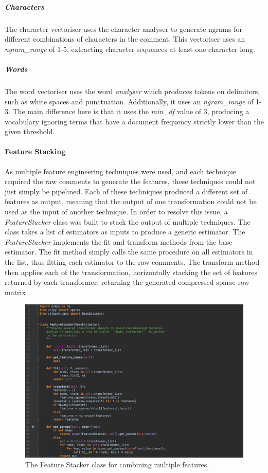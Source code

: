 \subparagraph{Characters} The character vectoriser uses the character analyser to generate ngrams for different combinations of characters in the comment. This vectoriser uses an \textit{ngram\_range} of 1-5, extracting character sequences at least one character long.

\subparagraph{Words} The word vectoriser uses the word \textit{analyser} which produces tokens on delimiters, such as white spaces and punctuation. Additionally, it uses an \textit{ngram\_range} of 1-3. The main difference here is that it uses the \textit{min\_df} value of 3, producing a vocabulary ignoring terms that have a document frequency strictly lower than the given threshold.

\paragraph{Feature Stacking}
As multiple feature engineering techniques were used, and each technique required the raw comments to generate the features, these techniques could not just simply be pipelined. Each of these techniques produced a different set of features as output, meaning that the output of one transformation could not be used as the input of another technique. In order to resolve this issue, a \textit{FeatureStacker} class was built to stack the output of multiple techniques. The class takes a list of estimators as inputs to produce a generic estimator. The \textit{FeatureStacker} implements the fit and transform methods from the base estimator. The fit method simply calls the same procedure on all estimators in the list, thus fitting each estimator to the raw comments. The transform method then applies each of the transformation, horizontally stacking the set of features returned by each transformer, returning the generated compressed sparse row matrix \cite{Scipy:ToCSR}.

\begin{figure}[H]
	\centering
	\includegraphics[width=\textwidth]{Images/Implementation/DataProcessing/AbuseDetection/FeatureStacker}
	\caption{The Feature Stacker class for combining multiple features.}
	\label{fig:AbuseDetection-FeatureStacker}
\end{figure}

